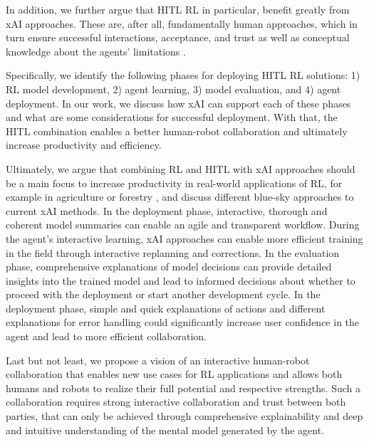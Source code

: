 \documentclass[twoside,11pt]{article}
\begin{document}
\begin{enumerate}
In addition, we further argue that HITL RL in particular, benefit greatly from xAI approaches. These are, after all, fundamentally human approaches, which in turn ensure successful interactions, acceptance, and trust as well as conceptual knowledge about the agents' limitations \citep{heuillet2021explainability,milani2022survey}.

Specifically, we identify the following phases for deploying HITL RL solutions: 1) RL model development, 2) agent learning, 3) model evaluation, and 4) agent deployment. In our work, we discuss how xAI can support each of these phases and what are some considerations for successful deployment. With that, the HITL combination enables a better human-robot collaboration and ultimately increase productivity and efficiency.

Ultimately, we argue that combining RL and HITL with xAI approaches should be a main focus to increase productivity in real-world applications of RL, for example in agriculture or forestry \citep{Holzinger:2022:DigitalTrans}, and discuss different blue-sky approaches to current xAI methods. In the deployment phase, interactive, thorough and coherent model summaries can enable an agile and transparent workflow. During the agent's interactive learning, xAI approaches can enable more efficient training in the field through interactive replanning and corrections. In the evaluation phase, comprehensive explanations of model decisions can provide detailed insights into the trained model and lead to informed decisions about whether to proceed with the deployment or start another development cycle. In the deployment phase, simple and quick explanations of actions and different explanations for error handling could significantly increase user confidence in the agent and lead to more efficient collaboration.

Last but not least, we propose a vision of an interactive human-robot collaboration that enables new use cases for RL applications and allows both humans and robots to realize their full potential and respective strengths. Such a collaboration requires strong interactive collaboration and trust between both parties, that can only be achieved through comprehensive explainability and deep and intuitive understanding of the mental model generated by the agent.

\end{enumerate}
\end{document}

